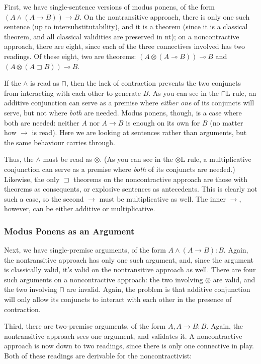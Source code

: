 \documentclass{ergoclass}
\newcommand{\sqq}[2]{\ensuremath{#1  \mathrel{:}  #2}}
\newcommand{\amcond}{\ensuremath{\rightarrow}}
\newcommand{\amand}{\ensuremath{\wedge}}
\newcommand{\mcond}{\ensuremath{\multimap}}
\newcommand{\mand}{\ensuremath{\otimes}}
\newcommand{\acond}{\ensuremath{\sqsupset}}
\newcommand{\aand}{\ensuremath{\sqcap}}
\newcommand{\ntlog}{{\sc nt}}
\begin{document}
First, we have single-sentence versions of modus ponens, of the form $(A \amand (A \amcond B)) \amcond B$. On the nontransitive approach, there is only one such sentence (up to intersubstitutability), and it is a theorem (since it is a classical theorem, and all classical validities are preserved in \ntlog); on a noncontractive approach, there are eight, since each of the three connectives involved has two readings. Of these eight, two are theorems: $(A \mand (A \mcond B)) \mcond B$ and $(A \mand (A \acond B)) \mcond B$. 

If the $\amand$ is read as $\aand$, then the lack of contraction prevents the two conjuncts from interacting with each other to generate $B$. As you can see in the $\aand$L rule, an additive conjunction can serve as a premise where {\em either one} of its conjuncts will serve, but not where {\em both} are needed. Modus ponens, though, is a case where both are needed: neither $A$ nor $A \amcond B$ is enough on its own for $B$ (no matter how $\amcond$ is read). Here we are looking at sentences rather than arguments, but the same behaviour carries through.

Thus, the $\wedge$ must be read as $\mand$. (As you can see in the $\mand$L rule, a multiplicative conjunction can serve as a premise where {\em both} of its conjuncts are needed.) Likewise, the only $\acond$ theorems on the noncontractive approach are those with theorems as consequents, or explosive sentences as antecedents. This is clearly not such a case, so the second $\amcond$ must be multiplicative as well. The inner $\amcond$, however, can be either additive or multiplicative.

\subsubsection{Modus Ponens as an Argument}

Next, we have single-premise arguments, of the form $\sqq{A \amand (A \amcond B)}{B}$. Again, the nontransitive approach has only one such argument, and, since the argument is classically valid, it's valid on the nontransitive approach as well. There are four such arguments on a noncontractive approach: the two involving $\mand$ are valid, and the two involving $\aand$ are invalid. Again, the problem is that additive conjunction will only allow its conjuncts to interact with each other in the presence of contraction.

Third, there are two-premise arguments, of the form $\sqq{A, A \amcond B}{B}$. Again, the nontransitive approach sees one argument, and validates it. A noncontractive approach is now down to two readings, since there is only one connective in play. Both of these readings are derivable for the noncontractivist:
\end{document}
